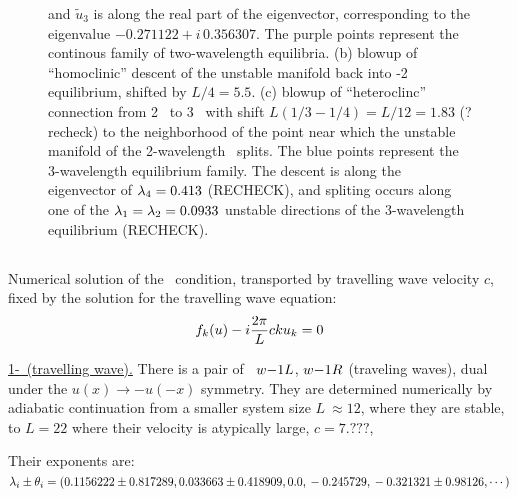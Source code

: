 \begin{figure}[h]
{ and $\tilde{u}_3$  is along the real part of the eigenvector, 
 corresponding to the eigenvalue $-0.271122+ i\, 0.356307$. The purple points represent the continous family
 of two-wavelength equilibria.
(b) blowup of ``homoclinic'' descent of the unstable manifold
back into {\nameit}-2 equilibrium, shifted by
$L/4 =5.5$.
(c) blowup of ``heteroclinc'' connection from 
{\nameit}2 \eqv\ to {\nameit}3 \eqv\, with shift 
$L(1/3-1/4) = L/12 = 1.83$ (? recheck)
to the neighborhood of the point near which the
unstable manifold of the 2-wavelength \eqv\ splits. The blue points
represent the 3-wavelength equilibrium family.
The descent is along the eigenvector of $\lambda_4= 0.413$ (RECHECK),
and spliting
occurs along one of the 
$\lambda_1=\lambda_2=0.0933$
unstable directions of the 3-wavelength equilibrium (RECHECK).
%
}
\label{f:neighborhood2w}
\end{figure}


\subsection{\Reqva}

Numerical solution of the \reqv\  condition,
transported by travelling wave velocity $c$, 
fixed by the solution for the travelling wave equation:
\[
f_k(u) - i{2\pi\over L} c k u_k = 0
\]

\underline{1-\reqv\  (travelling wave).}
There is a pair of \reqva\ 
${w-}1L$,
${w-}1R$
(traveling waves), dual under the
$u(x) \to -u(-x)$ symmetry. They are 
determined numerically by 
adiabatic continuation from a smaller system size
$L~\approx 12$,
where they are stable, to $L=22$
where their velocity is atypically large, $c=7.???$,

Their exponents are:
\\
$\lambda_i \pm \theta_i =
(
\\
  0.1156222 \pm 0.817289,	\\
  0.033663 \pm 0.418909,	\\
 0.0                    ,	\\
 -0.245729                    ,	\\
 -0.321321 \pm 0.98126,
\cdots
)$

